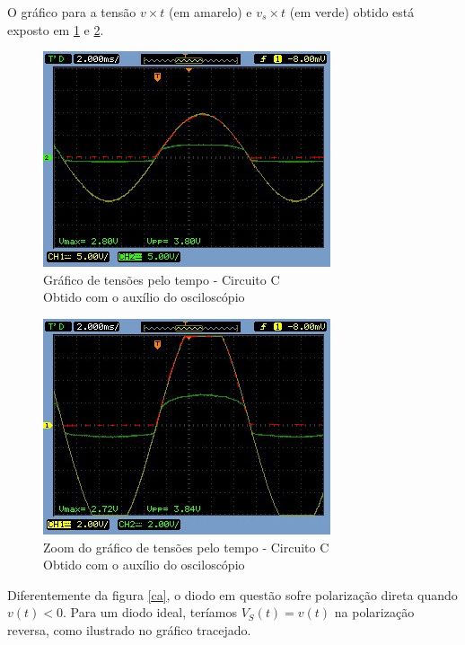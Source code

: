\documentclass[10pt, final, a4paper]{IEEEtran} %
\begin{document}
O gráfico para a tensão $v \times t$ (em amarelo) e $v_s \times t$ (em verde) obtido está exposto em \ref{c01} e \ref{c01_z}.

\begin{figure}[ht!]
	\captionsetup{justification=centering}
	\centering
	\includegraphics[width=0.8\linewidth]{imagens/circuitos_resp/c01.jpg}
	\caption{Gráfico de tensões pelo tempo - Circuito C\\ Obtido com o auxílio do osciloscópio}
	\label{c01}
\end{figure}
\FloatBarrier

\begin{figure}[ht!]
	\captionsetup{justification=centering}
	\centering
	\includegraphics[width=0.8\linewidth]{imagens/circuitos_resp/c01_z.jpg}
	\caption{Zoom do gráfico de tensões pelo tempo - Circuito C\\ Obtido com o auxílio do osciloscópio}
	\label{c01_z}
\end{figure}
\FloatBarrier

Diferentemente da figura \ref{ca}, o diodo em questão sofre polarização direta quando $v(t) < 0$. Para um diodo ideal, teríamos $V_S(t) = v(t)$ na polarização reversa, como ilustrado no gráfico tracejado.
\end{document}
